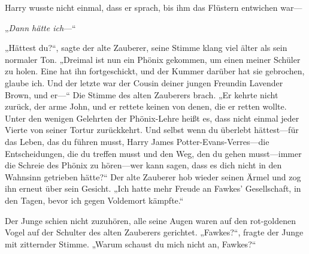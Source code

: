 Harry wusste nicht einmal, dass er sprach, bis ihm das Flüstern entwichen war—

 „\emph{Dann hätte ich}—“

„Hättest du?“, sagte der alte Zauberer, seine Stimme klang viel älter als sein normaler Ton. „Dreimal ist nun ein Phönix gekommen, um einen meiner Schüler zu holen. Eine hat ihn fortgeschickt, und der Kummer darüber hat sie gebrochen, glaube ich. Und der letzte war der Cousin deiner jungen Freundin Lavender Brown, und er—“
Die Stimme des alten Zauberers brach.
„Er kehrte nicht zurück, der arme John, und er rettete keinen von denen, die er retten wollte. Unter den wenigen Gelehrten der Phönix-Lehre heißt es, dass nicht einmal jeder Vierte von seiner Tortur zurückkehrt. Und selbst wenn du überlebt hättest—für das Leben, das du führen musst, Harry James Potter-Evans-Verres—die Entscheidungen, die du treffen musst und den Weg, den du gehen musst—immer die Schreie des Phönix zu hören—wer kann sagen, dass es dich nicht in den Wahnsinn getrieben hätte?“
Der alte Zauberer hob wieder seinen Ärmel und zog ihn erneut über sein Gesicht. „Ich hatte mehr Freude an Fawkes’ Gesellschaft, in den Tagen, bevor ich gegen Voldemort kämpfte.“

Der Junge schien nicht zuzuhören, alle seine Augen waren auf den rot-goldenen Vogel auf der Schulter des alten Zauberers gerichtet.
„Fawkes?“, fragte der Junge mit zitternder Stimme. „Warum schaust du mich nicht an, Fawkes?“


